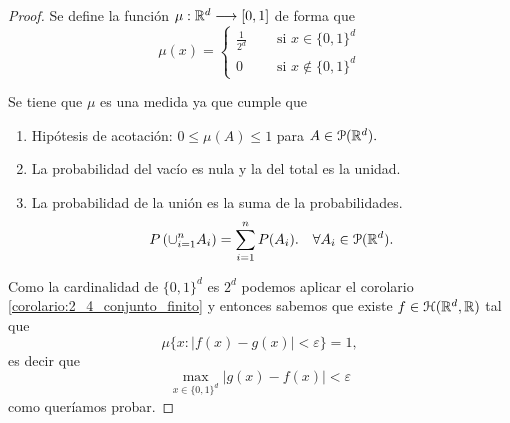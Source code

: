 \begin{proof}
    Se define la función $\mu : \mathbb{R}^d \longrightarrow [0,1]$ de forma que 
    \begin{equation}
        \mu(x) = 
      \left \{
    \begin{aligned}
      \frac{1}{2^d} \quad &\text{ si } x \in \{0,1\}^d \\
      0 \quad & \text{ si } x \notin \{0,1\}^d 
    \end{aligned}
  \right .
    \end{equation}

    Se tiene que $\mu$ es una medida ya que cumple que 
    \begin{enumerate}
        \item Hipótesis de acotación: $0 \leq \mu(A) \leq 1$ para $A \in \mathcal{P}(\mathbb{R}^d).$
        \item La probabilidad del vacío es nula y la del  total es la unidad. 
        \item La probabilidad de la unión es la suma de la probabilidades. 
        \begin{equation}
            P\left(
                \cup_{i=1}^n A_i
            \right)
            = \sum_{i=1}^n P(A_i).
            \quad
            \forall A_i \in  \mathcal{P}(\mathbb{R}^d).
        \end{equation}
    \end{enumerate}  

    Como la cardinalidad de $\{0,1\}^d$ es $2^d$
    podemos aplicar el corolario \ref{corolario:2_4_conjunto_finito}
    y entonces sabemos que  existe $f\in \mathcal{H}(\mathbb{R}^d,\mathbb{R})$ tal que 
    \begin{equation}
            \mu\{ 
                x:
                |f(x) - g(x)| 
                < \varepsilon
            \}
            = 1,
    \end{equation} 
    es decir que 
    \begin{equation}
        \max_{x \in \{ 0,1\}^d} |g(x) - f(x)|
        < \varepsilon
    \end{equation}
    como queríamos probar. 
\end{proof}


